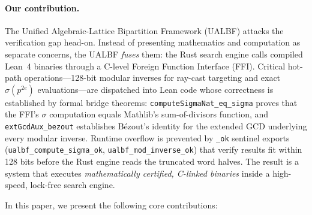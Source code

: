 \paragraph{Our contribution.}
The Unified Algebraic-Lattice Bipartition Framework (UALBF) attacks the
verification gap head-on.  Instead of presenting mathematics and
computation as separate concerns, the UALBF \emph{fuses} them: the Rust
search engine calls compiled Lean~4 binaries through a C-level Foreign
Function Interface (FFI)\@.  Critical hot-path operations---128-bit
modular inverses for ray-cast targeting and exact $\sigma(p^{2e})$
evaluations---are dispatched into Lean code whose correctness is
established by formal bridge theorems: \texttt{computeSigmaNat\_eq\_sigma}
proves that the FFI's $\sigma$ computation equals Mathlib's
sum-of-divisors function, and \texttt{extGcdAux\_bezout} establishes
B\'ezout's identity for the extended GCD underlying every modular inverse.
Runtime overflow is prevented by \texttt{\_ok} sentinel exports
(\texttt{ualbf\_compute\_sigma\_ok}, \texttt{ualbf\_mod\_inverse\_ok})
that verify results fit within 128 bits before the Rust engine reads the
truncated word halves.  The result is a system that executes
\emph{mathematically certified, C-linked binaries} inside a high-speed,
lock-free search engine.

\smallskip
In this paper, we present the following core contributions:

